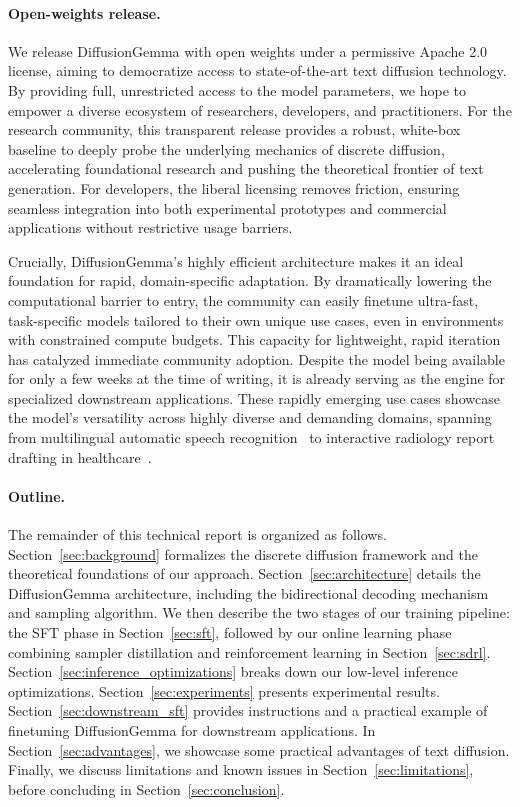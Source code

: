 \documentclass[11pt, a4paper, logo, copyright, gdm]{google}
\begin{document}
\paragraph{Open-weights release.} We release DiffusionGemma with open weights under a permissive Apache 2.0 license, aiming to democratize access to state-of-the-art text diffusion technology. By providing full, unrestricted access to the model parameters, we hope to empower a diverse ecosystem of researchers, developers, and practitioners. For the research community, this transparent release provides a robust, white-box baseline to deeply probe the underlying mechanics of discrete diffusion, accelerating foundational research and pushing the theoretical frontier of text generation. For developers, the liberal licensing removes friction, ensuring seamless integration into both experimental prototypes and commercial applications without restrictive usage barriers.


Crucially, DiffusionGemma's highly efficient architecture makes it an ideal foundation for rapid, domain-specific adaptation. By dramatically lowering the computational barrier to entry, the community can easily finetune ultra-fast, task-specific models tailored to their own unique use cases, even in environments with constrained compute budgets. This capacity for lightweight, rapid iteration has catalyzed immediate community adoption. Despite the model being available for only a few weeks at the time of writing, it is already serving as the engine for specialized downstream applications. These rapidly emerging use cases showcase the model's versatility across highly diverse and demanding domains, spanning from multilingual automatic speech recognition~\citep{interfaze2026diffusion} to interactive radiology report drafting in healthcare~\citep{van2026discrete}.

\paragraph{Outline.}
The remainder of this technical report is organized as follows. Section~\ref{sec:background} formalizes the discrete diffusion framework and the theoretical foundations of our approach. Section~\ref{sec:architecture} details the DiffusionGemma architecture, including the bidirectional decoding mechanism and sampling algorithm. We then describe the two stages of our training pipeline: the SFT phase in Section~\ref{sec:sft}, followed by our online learning phase combining sampler distillation and reinforcement learning in Section~\ref{sec:sdrl}. Section~\ref{sec:inference_optimizations} breaks down our low-level inference optimizations. Section~\ref{sec:experiments} presents experimental results. Section~\ref{sec:downstream_sft} provides instructions and a practical example of finetuning DiffusionGemma for downstream applications. In Section~\ref{sec:advantages}, we showcase some practical advantages of text diffusion. Finally, we discuss limitations and known issues in Section~\ref{sec:limitations}, before concluding in Section~\ref{sec:conclusion}.
\end{document}
